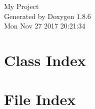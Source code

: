 \documentclass[twoside]{book}
\newcommand{\clearemptydoublepage}{%
  \newpage{\pagestyle{empty}\cleardoublepage}%
}
\begin{document}
\hypersetup{pageanchor=false}
\begin{titlepage}
\vspace*{7cm}
\begin{center}%
{\Large My Project }\\
\vspace*{1cm}
{\large Generated by Doxygen 1.8.6}\\
\vspace*{0.5cm}
{\small Mon Nov 27 2017 20:21:34}\\
\end{center}
\end{titlepage}
\clearemptydoublepage
\tableofcontents
\clearemptydoublepage
{}
\hypersetup{pageanchor=true}

\chapter{Class Index}

\chapter{File Index}

\end{document}
